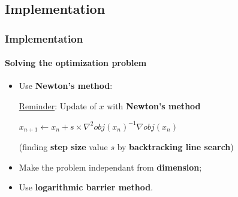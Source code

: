 \documentclass{beamer}
\begin{document}
\subsection{Implementation}

\begin{frame}
\tableofcontents[currentsubsection]
\end{frame}

\begin{frame}
\frametitle{Implementation}
\framesubtitle{Solving the optimization problem}

\begin{itemize}
\item Use \textbf{Newton's method}:

\bigskip

\begin{block}{\underline{Reminder}: Update of $x$ with \textbf{Newton's method}}
          \begin{center}
          $x_{n+1} \leftarrow x_{n} + s \times \nabla^2 obj(x_n)^{-1}\nabla obj(x_n)$
          \end{center}

  (finding \textbf{step size} value $s$ by \textbf{backtracking line search})
\end{block}

\bigskip
\pause

\item Make the problem independant from \textbf{dimension};

\bigskip
\pause

\item Use \textbf{logarithmic barrier method}.

\end{itemize}

\end{frame}
\end{document}
